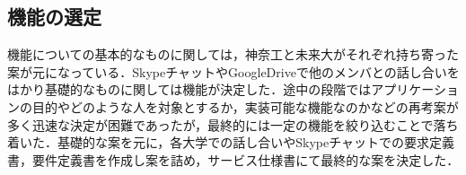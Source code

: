 \subsection{機能の選定}
\par
機能についての基本的なものに関しては，神奈工と未来大がそれぞれ持ち寄った案が元になっている．SkypeチャットやGoogleDriveで他のメンバとの話し合いをはかり基礎的なものに関しては機能が決定した．途中の段階ではアプリケーションの目的やどのような人を対象とするか，実装可能な機能なのかなどの再考案が多く迅速な決定が困難であったが，最終的には一定の機能を絞り込むことで落ち着いた．基礎的な案を元に，各大学での話し合いやSkypeチャットでの要求定義書，要件定義書を作成し案を詰め，サービス仕様書にて最終的な案を決定した．
